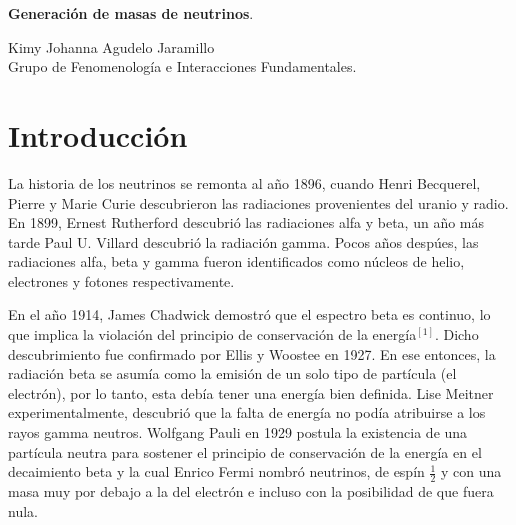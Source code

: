 \documentclass[12pt]{article}
\begin{document}

\pagestyle{fancy}




\begin{center}
    \Large \textbf{Generación de masas de neutrinos}. \normalsize
\end{center}

\begin{center}
    Kimy Johanna Agudelo Jaramillo  \\
    Grupo  de Fenomenología e Interacciones Fundamentales.
\end{center}

\section{Introducción}
%
La historia de los neutrinos se remonta al año 1896, cuando Henri Becquerel, Pierre y Marie Curie descubrieron las radiaciones provenientes del uranio y radio. En 1899, Ernest Rutherford descubrió las radiaciones alfa y beta, un año más tarde Paul U. Villard descubrió la radiación gamma. Pocos años despúes, las radiaciones alfa, beta y gamma fueron identificados como núcleos de helio, electrones y fotones respectivamente.

En el año 1914, James Chadwick demostró que el espectro beta es continuo, lo que implica la violación del principio de conservación de la energía$^{[1]}$. Dicho descubrimiento fue confirmado por Ellis y Woostee en 1927. En ese entonces, la radiación beta se asumía como la emisión de un solo tipo de partícula (el electrón), por lo tanto, esta debía tener una energía bien definida. Lise Meitner experimentalmente, descubrió que la falta de energía no podía atribuirse a los rayos gamma neutros.
 Wolfgang Pauli en 1929 postula la existencia de una partícula neutra para sostener el principio de conservación de la energía en el decaimiento beta y la cual Enrico Fermi  nombró neutrinos,  de espín $\frac{1}{2}$  y con una masa muy por debajo a la del electrón e incluso con la posibilidad de que fuera nula.
 
\end{document}
